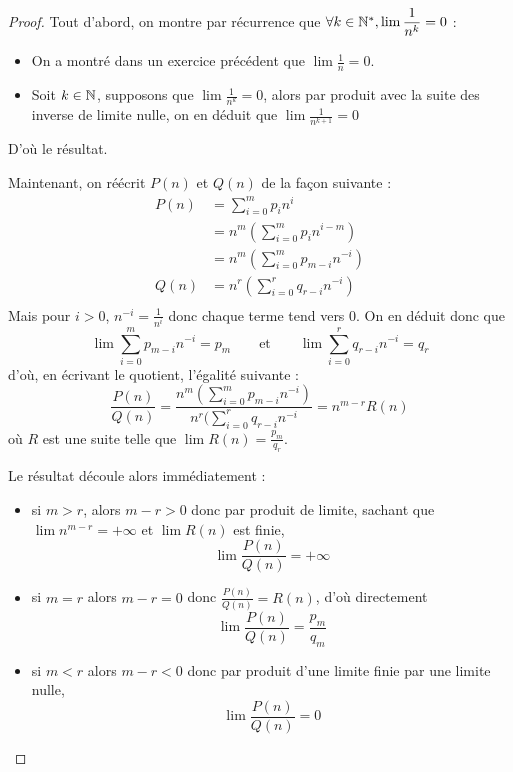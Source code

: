 \begin{proof}
    Tout d'abord, on montre par récurrence que $\forall k\in\mathbb{N}^*, \displaystyle{\lim \frac{1}{n^k}} = 0$ :
    \begin{itemize}[label=$\bullet$]
        \item On a montré dans un exercice précédent que $\displaystyle{\lim\frac{1}{n} = 0}$.
        \item Soit $k\in\mathbb{N}$, supposons que $\displaystyle{\lim \frac{1}{n^k} = 0}$, alors par produit avec la suite des inverse de limite nulle, on en déduit que $\displaystyle{\lim \frac{1}{n^{k+1}} = 0}$
    \end{itemize}
    D'où le résultat.

    Maintenant, on réécrit $P(n)$ et $Q(n)$ de la façon suivante :
    \begin{align*}
        P(n) &= \sum_{i=0}^m p_i n^i\\
        &= n^m \left(\sum_{i=0}^m p_i n^{i-m}\right)\\
        &= n^m \left(\sum_{i=0}^m p_{m-i} n^{-i}\right)\\
        Q(n) &= n^r \left(\sum_{i=0}^r q_{r-i} n^{-i}\right)\\
    \end{align*}
    Mais pour $i > 0$, $n^{-i} = \frac{1}{n^i}$ donc chaque terme tend vers $0$. On en déduit donc que $$\lim \sum_{i=0}^m p_{m-i} n^{-i} = p_m \qquad \textrm{et} \qquad \lim \sum_{i=0}^r q_{r-i} n^{-i} = q_r$$ d'où, en écrivant le quotient, l'égalité suivante : $$\frac{P(n)}{Q(n)} = \frac{n^m \left(\sum_{i=0}^m p_{m-i} n^{-i}\right)}{n^r (\sum_{i=0}^r q_{r-i} n^{-i}} = n^{m-r} R(n)$$ où $R$ est une suite telle que $\lim R(n) = \frac{p_m}{q_r}$.

    Le résultat découle alors immédiatement :
    \begin{itemize}[label=$\bullet$]
        \item si $m > r$, alors $m-r > 0$ donc par produit de limite, sachant que $\lim n^{m-r} =+\infty$ et $\lim R(n)$ est finie, $$\boxed{\lim \frac{P(n)}{Q(n)} = +\infty}$$
        \item si $m = r$ alors $m-r = 0$ donc $\frac{P(n)}{Q(n)} = R(n)$, d'où directement $$\boxed{\lim \frac{P(n)}{Q(n)} = \frac{p_m}{q_m}}$$
        \item si $m < r$ alors $m-r < 0$ donc par produit d'une limite finie par une limite nulle, $$\boxed{\lim \frac{P(n)}{Q(n)} = 0}$$
    \end{itemize}
\end{proof}

